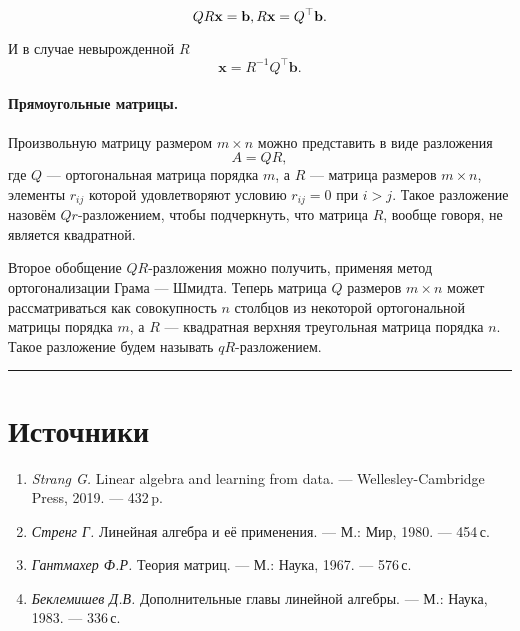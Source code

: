 \documentclass[11pt,a4paper]{article}
\providecommand{\tightlist}{%
      \setlength{\itemsep}{0pt}\setlength{\parskip}{0pt}}
\begin{document}
\[
  QR \mathbf{x} = \mathbf{b}, \\
  R \mathbf{x} = Q^\top \mathbf{b}.
\]

И в случае невырожденной \(R\) \[
  \mathbf{x} = R^{-1}Q^\top \mathbf{b}.
\]

    \hypertarget{ux43fux440ux44fux43cux43eux443ux433ux43eux43bux44cux43dux44bux435-ux43cux430ux442ux440ux438ux446ux44b}{%
\paragraph{Прямоугольные матрицы.} \label{ux43fux440ux44fux43cux43eux443ux433ux43eux43bux44cux43dux44bux435-ux43cux430ux442ux440ux438ux446ux44b}}

Произвольную матрицу размером \(m \times n\) можно представить в виде
разложения \[
  A = QR,
\] где \(Q\) --- ортогональная матрица порядка \(m\), а \(R\) ---
матрица размеров \(m \times n\), элементы \(r_{ij}\) которой
удовлетворяют условию \(r_{ij}=0\) при \(i>j\). Такое разложение назовём
\(Qr\)-разложением, чтобы подчеркнуть, что матрица \(R\), вообще говоря,
не является квадратной.

Второе обобщение \(QR\)-разложения можно получить, применяя метод
ортогонализации Грама --- Шмидта. Теперь матрица \(Q\) размеров
\(m \times n\) может рассматриваться как совокупность \(n\) столбцов из
некоторой ортогональной матрицы порядка \(m\), а \(R\) --- квадратная
верхняя треугольная матрица порядка \(n\). Такое разложение будем
называть \(qR\)-разложением.

    \begin{center}\rule{0.5\linewidth}{0.5pt}\end{center}

    \hypertarget{ux438ux441ux442ux43eux447ux43dux438ux43aux438}{%
\section{Источники}\label{ux438ux441ux442ux43eux447ux43dux438ux43aux438}}

\begin{enumerate}
\def\labelenumi{\arabic{enumi}.}
\tightlist
\item
  \emph{Strang G.} Linear algebra and learning from data. ---
  Wellesley-Cambridge Press, 2019. --- 432\,p.
\item
  \emph{Стренг Г.} Линейная алгебра и её применения. --- М.: Мир, 1980.
  --- 454\,с.
\item
  \emph{Гантмахер Ф.Р.} Теория матриц. --- М.: Наука, 1967. --- 576\,с.
\item
  \emph{Беклемишев Д.В.} Дополнительные главы линейной алгебры. --- М.:
  Наука, 1983. --- 336\,с.
\end{enumerate}


\end{document}
